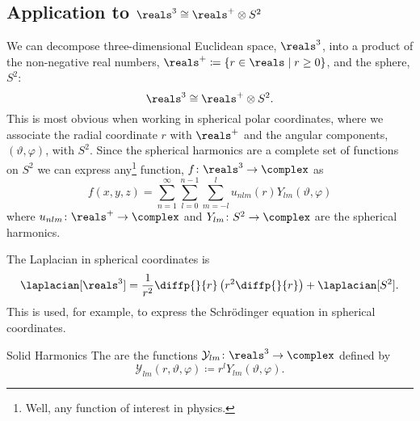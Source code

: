 \documentclass[fleqn]{NotesClass}
\newcommand*{\isomorphic}{\cong}
\newcommand*{\directproduct}{\otimes}
\begin{document}
    \subsection{Application to \texorpdfstring{\(\reals^3 \isomorphic \reals^+ \directproduct S^2\)}{R3 isomorphic R+ x S2}}
    We can decompose three-dimensional Euclidean space, \(\reals^3\), into a product of the non-negative real numbers, \(\reals^+ \coloneqq \{r \in \reals \mid r \ge 0\}\), and the sphere, \(S^2\):
    \begin{equation}
        \reals^3 \isomorphic \reals^+ \directproduct S^2.
    \end{equation}
    This is most obvious when working in spherical polar coordinates, where we associate the radial coordinate \(r\) with \(\reals^+\) and the angular components, \((\vartheta, \varphi)\), with \(S^2\).
    Since the spherical harmonics are a complete set of functions on \(S^2\) we can express any\footnote{Well, any function of interest in physics.} function, \(f \colon \reals^3 \to \complex\) as
    \begin{equation}
        f(x, y, z) = \sum_{n = 1}^{\infty} \sum_{l = 0}^{n - 1} \sum_{m = -l}^{l} u_{nlm}(r) Y_{lm}(\vartheta, \varphi)
    \end{equation}
    where \(u_{nlm} \colon \reals^+ \to \complex\) and \(Y_{lm}\colon S^2 \to \complex\) are the spherical harmonics.
    
    The Laplacian in spherical coordinates is
    \begin{equation}
        \laplacian[\reals^3] = \frac{1}{r^2} \diffp{}{r}\left( r^2 \diffp{}{r} \right) + \laplacian[S^2].
    \end{equation}
    This is used, for example, to express the Schrödinger equation in spherical coordinates.
    
    \begin{dfn}{Solid Harmonics}{}
        The  are the functions \(\mathcal{Y}_{lm} \colon \reals^3 \to \complex\) defined by
        \begin{equation}
            \mathcal{Y}_{lm}(r, \vartheta, \varphi) \coloneqq r^{l} Y_{lm}(\vartheta, \varphi).
        \end{equation}
    \end{dfn}
    
\end{document}
